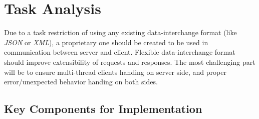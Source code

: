 \documentclass[english, sem, kiv, he, iso690alph, pdf, viewonly]{fasthesis}
\begin{document}
\chapter{Task Analysis}

Due to a task restriction of using any existing data-interchange format (like \textit{\ac{JSON}} or \textit{\ac{XML}}), a proprietary one should be created to be used in communication between server and client. Flexible data-interchange format should improve extensibility of requests and responses.
The most challenging part will be to ensure multi-thread clients handing on server side, and proper error/unexpected behavior handing on both sides.

\section{Key Components for Implementation}
\end{document}
